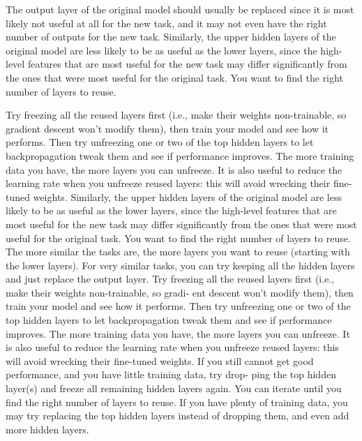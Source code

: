 The output layer of the original model should usually be replaced since it is most likely not useful at all for the new task, and it may not even have the right number of outputs for the new task. Similarly, the upper hidden layers of the original model are less likely to be as useful as the lower layers, since the high-level features that are most useful for the new task may differ significantly from the ones that were most useful for the original task. You want to find the right number of layers to reuse.

Try freezing all the reused layers first (i.e., make their weights non-trainable, so gradient descent won't modify them), then train your model and see how it performs. Then try unfreezing one or two of the top hidden layers to let backpropagation tweak them and see if performance improves. The more training data you have, the more layers you can unfreeze. It is also useful to reduce the learning rate when you unfreeze reused layers: this will avoid wrecking their fine-tuned weights. 
Similarly, the upper hidden layers of the original model are less likely to be as useful as the lower layers, since the high-level features that are most useful for the new task may differ significantly from the ones that were most useful for the original task. You want to find the right number of layers to reuse.
The more similar the tasks are, the more layers you want to reuse (starting with the lower layers). For very similar tasks, you can try keeping all the hidden layers and just replace the output layer.
Try freezing all the reused layers first (i.e., make their weights non-trainable, so gradi‐ ent descent won’t modify them), then train your model and see how it performs. Then try unfreezing one or two of the top hidden layers to let backpropagation tweak them and see if performance improves. The more training data you have, the more layers you can unfreeze. It is also useful to reduce the learning rate when you unfreeze reused layers: this will avoid wrecking their fine-tuned weights.
If you still cannot get good performance, and you have little training data, try drop‐ ping the top hidden layer(s) and freeze all remaining hidden layers again. You can iterate until you find the right number of layers to reuse. If you have plenty of training data, you may try replacing the top hidden layers instead of dropping them, and even add more hidden layers.

